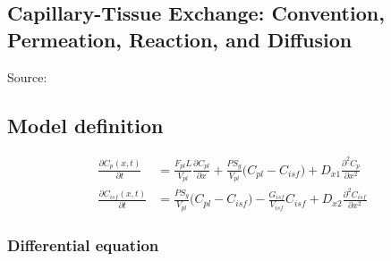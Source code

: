 \subsection{Capillary-Tissue Exchange: Convention, Permeation, Reaction, and Diffusion}
\label{sec:capillaryTissueEq}

Source: \cite{Bassingthwaighte2012}

\subsection*{Model definition}

\begin{align}
\frac{\partial C_p(x,t)}{\partial t} & = \frac{F_{pl}L}{V_{pl}} \frac{\partial C_{pl}}{\partial x} + \frac{PS_g}{V_{pl}} \big(C_{pl} - C_{isf} \big) + D_{x1}\frac{\partial^2 C_p}{\partial x^2} \nonumber\\
\frac{\partial C_{isf}(x,t)}{\partial t} & = \frac{PS_g}{V_{pl}} \big(C_{pl} - C_{isf} \big) - \frac{G_{isf}}{V_{isf}}C_{isf} + D_{x2}\frac{\partial^2 C_{isf}}{\partial x^2} \nonumber
\end{align}


\subsubsection*{Differential equation}

